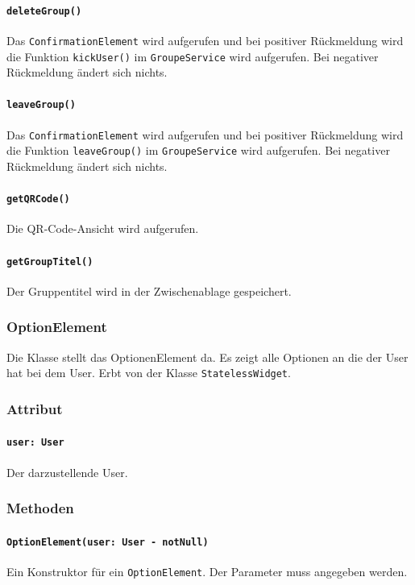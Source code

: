 \documentclass{entwurfsheft}
\begin{document}
            \paragraph*{\texttt{deleteGroup()}} Das \texttt{ConfirmationElement} wird aufgerufen und bei positiver Rückmeldung wird die Funktion  \texttt{kickUser()} im  \texttt{GroupeService} wird aufgerufen. Bei negativer Rückmeldung ändert sich nichts.
            \paragraph*{\texttt{leaveGroup()}} Das \texttt{ConfirmationElement} wird aufgerufen und bei positiver Rückmeldung wird die Funktion  \texttt{leaveGroup()} im \texttt{GroupeService} wird aufgerufen. Bei negativer Rückmeldung ändert sich nichts.

            \paragraph*{\texttt{getQRCode()}} Die QR-Code-Ansicht wird aufgerufen.
            \paragraph*{\texttt{getGroupTitel()}} Der Gruppentitel wird in der Zwischenablage gespeichert.

    \subsubsection{OptionElement}
        Die Klasse stellt das OptionenElement da. Es zeigt alle Optionen an die der User hat bei dem User. Erbt von der Klasse \texttt{StatelessWidget}.
        \subsubsection*{Attribut}
            \paragraph*{\texttt{user: User}} Der darzustellende User.

        \subsubsection*{Methoden}
            \paragraph*{\texttt{OptionElement(user: User - notNull)}} Ein Konstruktor für ein \texttt{OptionElement}. Der Parameter muss angegeben werden. 
\end{document}
